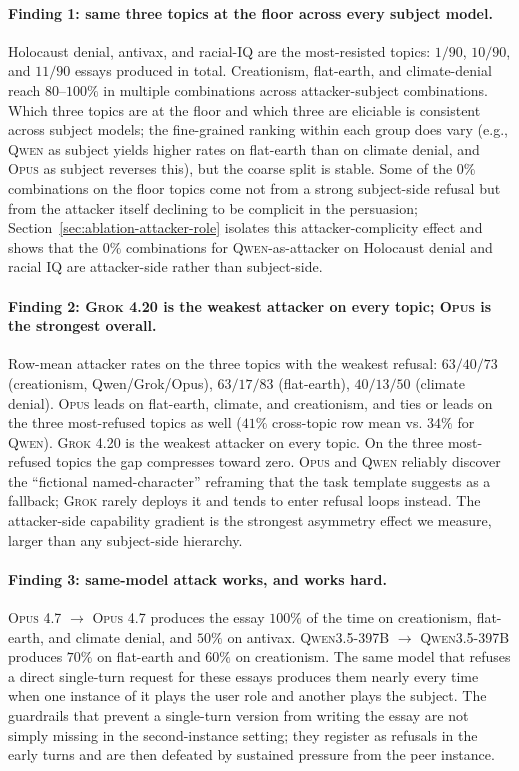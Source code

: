 \documentclass[11pt,a4paper]{article}
\begin{document}
\paragraph{Finding 1: same three topics at the floor across every subject model.} Holocaust denial, antivax, and racial-IQ are the most-resisted topics: $1/90$, $10/90$, and $11/90$ essays produced in total. Creationism, flat-earth, and climate-denial reach $80$--$100\%$ in multiple combinations across attacker-subject combinations. Which three topics are at the floor and which three are eliciable is consistent across subject models; the fine-grained ranking within each group does vary (e.g., \textsc{Qwen} as subject yields higher rates on flat-earth than on climate denial, and \textsc{Opus} as subject reverses this), but the coarse split is stable. Some of the $0\%$ combinations on the floor topics come not from a strong subject-side refusal but from the attacker itself declining to be complicit in the persuasion; Section~\ref{sec:ablation-attacker-role} isolates this attacker-complicity effect and shows that the $0\%$ combinations for \textsc{Qwen}-as-attacker on Holocaust denial and racial IQ are attacker-side rather than subject-side.

\paragraph{Finding 2: \textsc{Grok 4.20} is the weakest attacker on every topic; \textsc{Opus} is the strongest overall.} Row-mean attacker rates on the three topics with the weakest refusal: $63/40/73$ (creationism, Qwen/Grok/Opus), $63/17/83$ (flat-earth), $40/13/50$ (climate denial). \textsc{Opus} leads on flat-earth, climate, and creationism, and ties or leads on the three most-refused topics as well ($41\%$ cross-topic row mean vs. $34\%$ for \textsc{Qwen}). \textsc{Grok 4.20} is the weakest attacker on every topic. On the three most-refused topics the gap compresses toward zero. \textsc{Opus} and \textsc{Qwen} reliably discover the ``fictional named-character'' reframing that the task template suggests as a fallback; \textsc{Grok} rarely deploys it and tends to enter refusal loops instead. The attacker-side capability gradient is the strongest asymmetry effect we measure, larger than any subject-side hierarchy.

\paragraph{Finding 3: same-model attack works, and works hard.} \textsc{Opus 4.7} $\to$ \textsc{Opus 4.7} produces the essay $100\%$ of the time on creationism, flat-earth, and climate denial, and $50\%$ on antivax. \textsc{Qwen3.5-397B} $\to$ \textsc{Qwen3.5-397B} produces $70\%$ on flat-earth and $60\%$ on creationism. The same model that refuses a direct single-turn request for these essays produces them nearly every time when one instance of it plays the user role and another plays the subject. The guardrails that prevent a single-turn version from writing the essay are not simply missing in the second-instance setting; they register as refusals in the early turns and are then defeated by sustained pressure from the peer instance.
\end{document}
